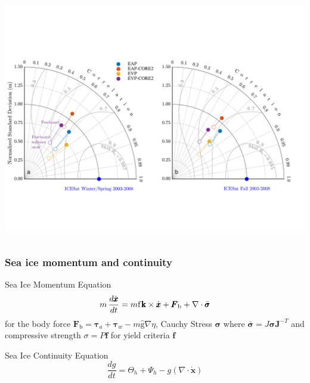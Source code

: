 \documentclass[aspectratio=169,11pt]{beamer}
\begin{document}
\begin{frame}
\begin{columns}
\begin{column}{0.7\textwidth}
\includegraphics[height=\textheight,keepaspectratio]{Figures/R1009RBRceap01a_R1009Gceap01d_R1009RBRcevp01a_R1009Gcevp01d_icesat_zwally_taylor2003_2008.png}
\end{column}
\end{columns}
\end{frame}

\begin{frame}
\frametitle{Sea ice momentum and continuity}
\begin{center}

\vspace{7mm}
Sea Ice Momentum Equation
\begin{equation*}
	m\,\frac{d\dot{\pmb{x}}}{dt} = m{\textrm{f}}\,\textrm{\pmb{k}}\times \dot{\pmb{x}} + \pmb{F}_{\textrm{b}}  + \nabla\cdot \bar{\pmb{\sigma}}
\end{equation*}
for the body force $\pmb{F}_{\textrm{b}}=\pmb{\tau}_a+\pmb{\tau}_w - m\hat{\textrm{g}}\nabla\eta$, Cauchy Stress $\pmb{\sigma}$ where $\bar{\pmb{\sigma}}\!=\!J{\pmb{\sigma}}\pmb{J}^{-T}$ and compressive strength $\pmb{\mathcal{\sigma}} = P\pmb{f}$ for yield criteria $\pmb{f}$

\vspace{7mm}

Sea Ice Continuity Equation
\begin{equation*}
\frac{d g}{d t}=\Theta_{h} + \Psi_{h} - g(\nabla \cdot \dot{\pmb{x}})
\end{equation*}

\vspace{7mm}
\end{center}
\end{frame}
\end{document}
